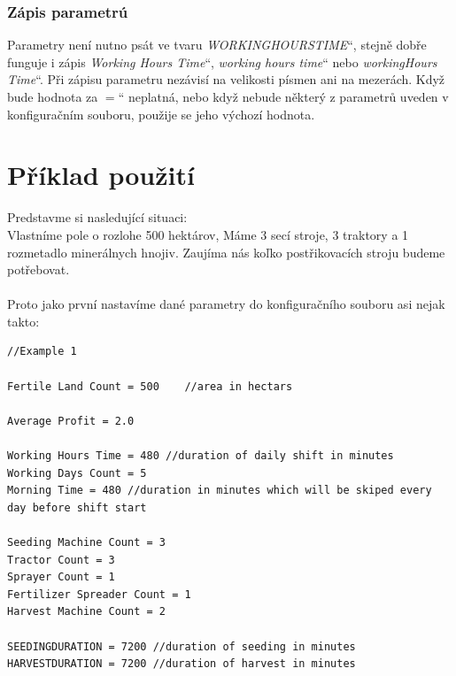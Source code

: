\documentclass[11pt,a4paper,titlepage]{article}
\newcommand{\ceskeuvozovky}[1]{\quotedblbase#1\textquotedblleft}
\begin{document}
\subsubsection{Zápis parametrú}
Parametry není nutno psát ve tvaru \ceskeuvozovky{\emph{WORKINGHOURSTIME}}, stejně dobře funguje i zápis \ceskeuvozovky{\emph{Working Hours Time}}, \ceskeuvozovky{\emph{working hours time}} nebo \ceskeuvozovky{\emph{workingHours Time}}. Při zápisu parametru nezávisí na velikosti písmen ani na mezerách. Když bude hodnota za \ceskeuvozovky{$=$} neplatná, nebo když nebude některý z parametrů uveden v konfiguračním souboru, použije se jeho výchozí hodnota.

\section{Příklad použití}

Predstavme si nasledující situaci: \\
Vlastníme pole o rozlohe 500 hektárov, Máme 3 secí stroje, 3 traktory a 1 rozmetadlo minerálnych hnojiv. Zaujíma nás koľko postřikovacích stroju budeme potřebovat. \\ \\

Proto jako první nastavíme dané parametry do konfiguračního souboru asi nejak takto: \\

\begin{lstlisting}
//Example 1

Fertile Land Count = 500    //area in hectars

Average Profit = 2.0

Working Hours Time = 480 //duration of daily shift in minutes
Working Days Count = 5
Morning Time = 480 //duration in minutes which will be skiped every day before shift start

Seeding Machine Count = 3
Tractor Count = 3
Sprayer Count = 1
Fertilizer Spreader Count = 1
Harvest Machine Count = 2

SEEDINGDURATION = 7200 //duration of seeding in minutes
HARVESTDURATION = 7200 //duration of harvest in minutes
\end{lstlisting}


\newpage

\end{document}

